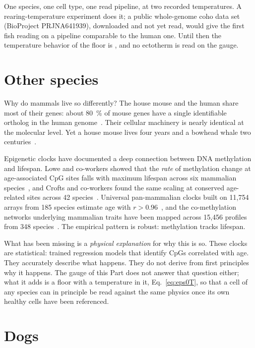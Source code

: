 \begin{keybox}[title=The test that decides]
One species, one cell type, one read pipeline, at two recorded temperatures. A rearing-temperature experiment does it; a
public whole-genome coho data set (BioProject PRJNA641939), downloaded and not yet read, would give the first fish reading on a pipeline comparable to the human one. Until then
the temperature behavior of the floor is \openprob, and no ectotherm is read on the gauge.
\end{keybox}

\section{Other species}\label{sec:p4_species}

Why do mammals live so differently? The house mouse and the human share most of their genes: about 80~\% of mouse genes
have a single identifiable ortholog in the human genome~\cite{Waterston2002}. Their cellular machinery is nearly identical
at the molecular level. Yet a house mouse lives four years and a bowhead whale two centuries~\cite{Tacutu2018}. \observed

Epigenetic clocks have documented a deep connection between DNA methylation and lifespan. Lowe and co-workers showed that the
\emph{rate} of methylation change at age-associated CpG sites falls with maximum lifespan across six mammalian
species~\cite{Lowe2018}, and Crofts and co-workers found the same scaling at conserved age-related sites across 42
species~\cite{Crofts2024}. Universal pan-mammalian clocks built on 11,754 arrays from 185 species estimate age with
$r>0.96$~\cite{Lu2023}, and the co-methylation networks underlying mammalian traits have been mapped across 15,456 profiles
from 348 species~\cite{Haghani2023}. The empirical pattern is robust: methylation tracks lifespan. \observed{}

What has been missing is a \emph{physical explanation} for why this is so. These clocks are statistical: trained regression
models that identify CpGs correlated with age. They accurately describe what happens. They do not derive from first
principles why it happens. \interp{}
The gauge of this Part does not answer that question either; what it adds is a floor with a temperature in it,
Eq.~\eqref{eq:eps0T}, so that a cell of any species can in principle be read against the same physics once its own healthy
cells have been referenced.

\section{Dogs}

